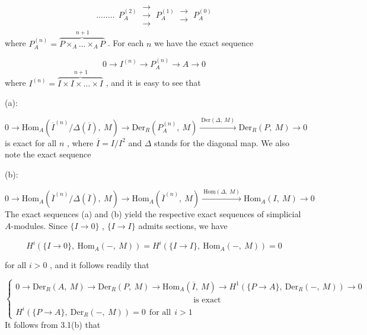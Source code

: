 \begin{multline}\tag{*}
........\ \ P_A^{(2)} \ \mathrel{\substack{\to\\ \to\\ \to}} \ P_A^{(1)} \ \mathrel{\substack{\to\\ \to}} \ P_A^{(0)}
\end{multline}
where  $P_A^{(n)} = \overbrace{P\times_A \ldots \times_A P}^{\,n+1}$  . For each  $n$  we have the exact sequence

\begin{equation*}
0 \to I^{(n)} \to P_A^{(n)} \to A \to 0
\end{equation*}
where  $I^{(n)} = \overbrace{I\times I\times \ldots \times I}^{\,n+1}$  , and it is easy to see that

(a):

\begin{equation*}
0 \to \mathrm{Hom}_A(\overline{I}^{(n)}/\Delta(\overline{I}),\ M) \to \mathrm{Der}_R(P_A^{(n)},\ M) \xrightarrow{\ \mathrm{Der}(\Delta,\ M)\ } \mathrm{Der}_R(P,\ M) \to 0
\end{equation*}
is exact for all  $n$  , where  $\overline{I} = I/I^2$  and  $\Delta$  stands for the diagonal map. We also note the exact sequence

(b):

\begin{equation*}
0 \to \mathrm{Hom}_A(\overline{I}^{(n)}/\Delta(\overline{I}),\ M) \to \mathrm{Hom}_A(\overline{I}^{(n)},\ M) \xrightarrow{\ \mathrm{Hom}(\Delta,\ M)\ } \mathrm{Hom}_A(I,\ M) \to 0
\end{equation*}
The exact sequences (a) and (b) yield the respective exact sequences of simplicial $A$-modules. Since  $\{I \to 0\}$ , $\{I \to I\}$  admits sections, we have

\begin{equation*}
H^i(\{I \to 0\},\ \mathrm{Hom}_A(-,\ M)) = H^i(\{I \to I\},\ \mathrm{Hom}_A(-,\ M)) = 0 
\end{equation*}


 for all  $i > 0$  , and it follows readily that

\begin{equation*}
\left\{\begin{array}{l}
0 \to \mathrm{Der}_R(A,\ M) \to \mathrm{Der}_R(P,\ M) \to \mathrm{Hom}_A(\overline{I},\ M) \to H^1(\{P \to A\},\ \mathrm{Der}_R(-,\ M)) \to 0 \\[4pt]
\hspace{9cm}\text{is exact} \\[4pt]
H^i(\{P \to A\},\ \mathrm{Der}_R(-,\ M)) = 0 \ \ \text{for all} \ \ i > 1
\end{array}\right.
\end{equation*}
It follows from 3.1(b) that


